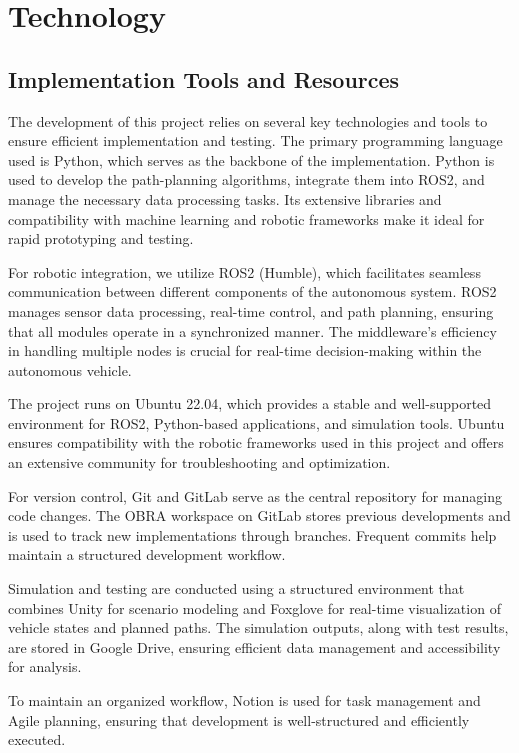 \documentclass[a4paper,11pt]{report}
\begin{document}
\section{Technology}
\subsection{Implementation Tools and Resources}
The development of this project relies on several key technologies and tools to ensure efficient implementation and testing. The primary programming language used is Python, which serves as the backbone of the implementation. Python is used to develop the path-planning algorithms, integrate them into ROS2, and manage the necessary data processing tasks. Its extensive libraries and compatibility with machine learning and robotic frameworks make it ideal for rapid prototyping and testing.

For robotic integration, we utilize ROS2 (Humble), which facilitates seamless communication between different components of the autonomous system. ROS2 manages sensor data processing, real-time control, and path planning, ensuring that all modules operate in a synchronized manner. The middleware's efficiency in handling multiple nodes is crucial for real-time decision-making within the autonomous vehicle.

The project runs on Ubuntu 22.04, which provides a stable and well-supported environment for ROS2, Python-based applications, and simulation tools. Ubuntu ensures compatibility with the robotic frameworks used in this project and offers an extensive community for troubleshooting and optimization.

For version control, Git and GitLab serve as the central repository for managing code changes. The OBRA workspace on GitLab stores previous developments and is used to track new implementations through branches. Frequent commits help maintain a structured development workflow.

Simulation and testing are conducted using a structured environment that combines Unity for scenario modeling and Foxglove for real-time visualization of vehicle states and planned paths. The simulation outputs, along with test results, are stored in Google Drive, ensuring efficient data management and accessibility for analysis.

To maintain an organized workflow, Notion is used for task management and Agile planning, ensuring that development is well-structured and efficiently executed.
\end{document}
